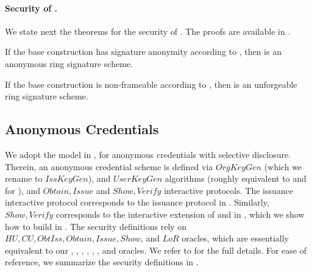 \paragraph{Security of \CUASRing.} %
We state next the theorems for the security of \CUASRing. The proofs are
available in .

\begin{theorem}
  If the base \CUASGen construction has signature anonymity according to
  , then \CUASRing is an anonymous ring signature
  scheme.
\end{theorem}

\begin{theorem}
  If the base \CUASGen construction is non-frameable according to
  , then \CUASRing is an unforgeable ring signature
  scheme.
\end{theorem}

\subsection{Anonymous Credentials}
\label{ssec:related-models-ac}

We adopt the model in \cite{fhs19}, for anonymous credentials with selective
disclosure. Therein, an anonymous credential scheme is
defined via $OrgKeyGen$ (which we rename to $IssKeyGen$), and $UserKeyGen$
algorithms (roughly equivalent to
\IKeyGen and \UKeyGen for \UAS), and $Obtain,Issue$ and $Show,Verify$
interactive protocols. The issuance interactive protocol corresponds to
the issuance protocol in \UAS. Similarly, $Show,Verify$ corresponds to
the interactive extension of \Sign and \Verify in \UAS, which we show how
to build in . The security definitions rely on
$HU, CU, ObtIss, Obtain, Issue,Show$, and $LoR$ oracles, which are essentially
equivalent to our \HUGEN, \CUGEN, \OBTISS, \OBTAIN, \ISSUE, \SIGN, and \CHALb
oracles. We refer to \cite{fhs19} for the full details. For ease of reference,
we summarize the security definitions in .%

